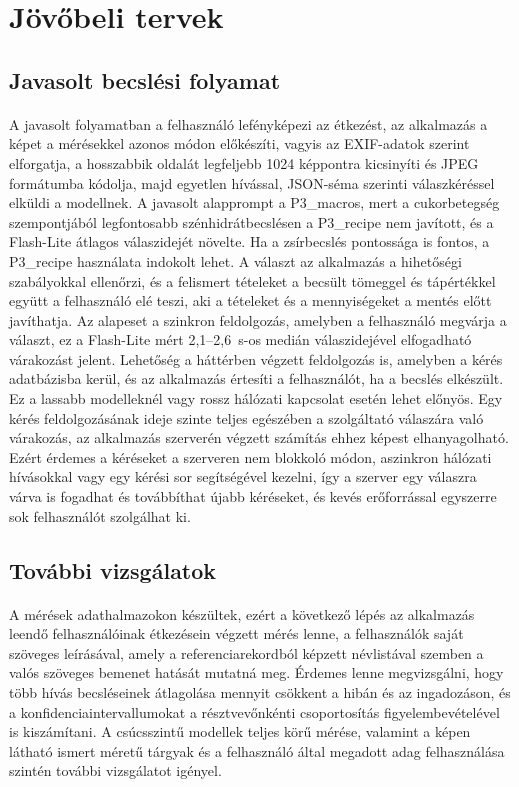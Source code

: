 \section{Jövőbeli tervek}
\subsection{Javasolt becslési folyamat}
\label{sec:javasolt_folyamat}
\paragraph{}A javasolt folyamatban a felhasználó lefényképezi az étkezést, az alkalmazás a képet a 
mérésekkel azonos módon előkészíti, vagyis az EXIF-adatok szerint elforgatja, a hosszabbik oldalát 
legfeljebb 1024 képpontra kicsinyíti és JPEG formátumba kódolja, majd egyetlen hívással, JSON-séma 
szerinti válaszkéréssel elküldi a modellnek. A javasolt alapprompt a P3\_macros, mert a cukorbetegség szempontjából 
legfontosabb szénhidrátbecslésen a P3\_recipe nem javított, és a Flash-Lite átlagos válaszidejét növelte. 
Ha a zsírbecslés pontossága is fontos, a P3\_recipe használata indokolt lehet. A választ az alkalmazás a 
hihetőségi szabályokkal ellenőrzi, és a felismert tételeket a becsült tömeggel és tápértékkel együtt 
a felhasználó elé teszi, aki a tételeket és a mennyiségeket a mentés előtt javíthatja. Az alapeset a 
szinkron feldolgozás, amelyben a felhasználó megvárja a választ, ez a Flash-Lite mért 2,1--2,6~s-os 
medián válaszidejével elfogadható várakozást jelent. Lehetőség a háttérben végzett feldolgozás is, 
amelyben a kérés adatbázisba kerül, és az alkalmazás értesíti a felhasználót, ha a becslés elkészült. 
Ez a lassabb modelleknél vagy rossz hálózati kapcsolat esetén lehet előnyös.
Egy kérés feldolgozásának ideje szinte teljes egészében a szolgáltató válaszára való várakozás, 
az alkalmazás szerverén végzett számítás ehhez képest elhanyagolható. Ezért érdemes a kéréseket 
a szerveren nem blokkoló módon, aszinkron hálózati hívásokkal vagy egy kérési sor segítségével 
kezelni, így a szerver egy válaszra várva is fogadhat és továbbíthat újabb kéréseket, és kevés 
erőforrással egyszerre sok felhasználót szolgálhat ki.

\subsection{További vizsgálatok}
\paragraph{}A mérések adathalmazokon készültek, ezért a következő lépés az alkalmazás leendő 
felhasználóinak étkezésein végzett mérés lenne, a felhasználók saját szöveges leírásával, amely a 
referenciarekordból képzett névlistával szemben a valós szöveges bemenet hatását mutatná meg. Érdemes 
lenne megvizsgálni, hogy több hívás becsléseinek átlagolása mennyit csökkent a hibán és az 
ingadozáson, és a konfidenciaintervallumokat a résztvevőnkénti csoportosítás figyelembevételével is 
kiszámítani. A csúcsszintű modellek teljes körű mérése, valamint a képen látható ismert méretű 
tárgyak és a felhasználó által megadott adag felhasználása szintén további vizsgálatot igényel.

